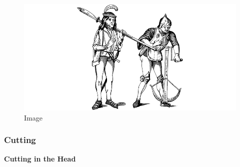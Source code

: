 \begin{figure}
\centering
\includegraphics{./images/combat03.pdf}
\caption{Image}
\end{figure}

\hypertarget{cutting}{%
\subsubsection{Cutting}\label{cutting}}

\textbf{Cutting in the Head}


